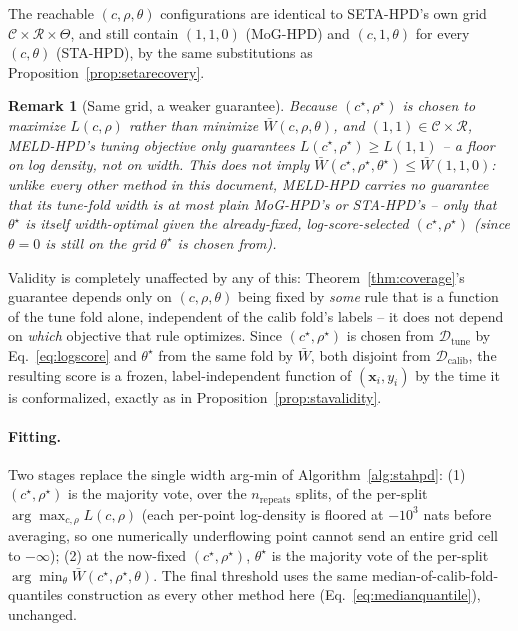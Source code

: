 \documentclass[11pt]{article}
\newtheorem{remark}{Remark}[section]
\begin{document}
The reachable $(c,\rho,\theta)$ configurations are identical to SETA-HPD's own grid $\mathcal
C\times\mathcal R\times\Theta$, and still contain $(1,1,0)$ (MoG-HPD) and $(c,1,\theta)$ for every
$(c,\theta)$ (STA-HPD), by the same substitutions as Proposition~\ref{prop:setarecovery}.

\begin{remark}[Same grid, a weaker guarantee]
\label{rem:meldweakfloor}
Because $(c^\star,\rho^\star)$ is chosen to \emph{maximize} $L(c,\rho)$ rather than \emph{minimize}
$\bar W(c,\rho,\theta)$, and $(1,1)\in\mathcal C\times\mathcal R$, MELD-HPD's tuning objective only
guarantees $L(c^\star,\rho^\star)\ge L(1,1)$ -- a floor on \emph{log density}, not on width. This
does \emph{not} imply $\bar W(c^\star,\rho^\star,\theta^\star)\le\bar W(1,1,0)$: unlike every other
method in this document, MELD-HPD carries no guarantee that its tune-fold width is at most plain
MoG-HPD's or STA-HPD's -- only that $\theta^\star$ is itself width-optimal \emph{given} the
already-fixed, log-score-selected $(c^\star,\rho^\star)$ (since $\theta=0$ is still on the grid
$\theta^\star$ is chosen from).
\end{remark}

Validity is completely unaffected by any of this: Theorem~\ref{thm:coverage}'s guarantee depends
only on $(c,\rho,\theta)$ being fixed by \emph{some} rule that is a function of the tune fold
alone, independent of the calib fold's labels -- it does not depend on \emph{which} objective that
rule optimizes. Since $(c^\star,\rho^\star)$ is chosen from $\mathcal D_{\mathrm{tune}}$ by
Eq.~\eqref{eq:logscore} and $\theta^\star$ from the same fold by $\bar W$, both disjoint from
$\mathcal D_{\mathrm{calib}}$, the resulting score is a frozen, label-independent function of
$(\bm x_i,y_i)$ by the time it is conformalized, exactly as in
Proposition~\ref{prop:stavalidity}.

\paragraph{Fitting.} Two stages replace the single width arg-min of Algorithm~\ref{alg:stahpd}: (1)
$(c^\star,\rho^\star)$ is the majority vote, over the $n_{\mathrm{repeats}}$ splits, of the
per-split $\arg\max_{c,\rho} L(c,\rho)$ (each per-point log-density is floored at $-10^3$ nats
before averaging, so one numerically underflowing point cannot send an entire grid cell to
$-\infty$); (2) at the now-fixed $(c^\star,\rho^\star)$, $\theta^\star$ is the majority vote of the
per-split $\arg\min_\theta \bar W(c^\star,\rho^\star,\theta)$. The final threshold uses the same
median-of-calib-fold-quantiles construction as every other method here
(Eq.~\ref{eq:medianquantile}), unchanged.
\end{document}
